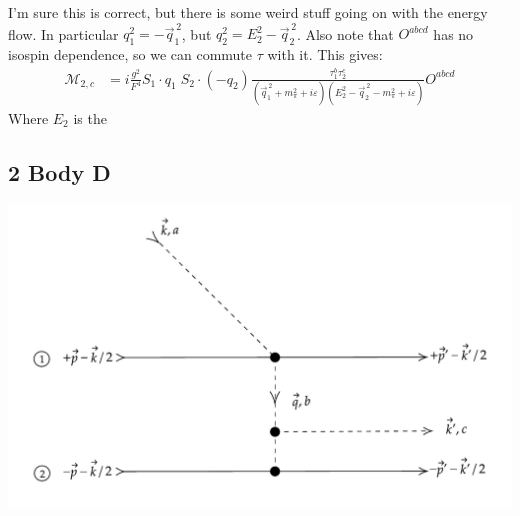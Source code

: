 \documentclass[11pt]{article}
\newcommand\mm{\mathcal{M}}
\newcommand{\sq}{^{\,2}}
\begin{document}
I'm sure this is correct, but there is some weird stuff going on with the energy flow.
In particular $q_1^2 =-\vec{q}_1\sq$, but $q_2^2=E_2^2 - \vec{q}_2\sq$.
Also note that $O^{abcd}$ has no isospin dependence, so we can commute $\tau$ with it. This gives:
\begin{align}
    \mm_{2,c}&=i \frac{g^2}{F^4} S_1 \cdot q_1\; S_2 \cdot(-q_2) 
    \frac{\tau_1^b \tau_2^c}{
        (\vec{q}_1\sq +m_\pi^2 + i \varepsilon)
        (E_2^2-\vec{q}_2\sq-m_\pi^2 + i \varepsilon)
    }
    O^{abcd}
\end{align}
Where $E_2$ is the 
\subsection{2 Body D}
\begin{center}
    \includegraphics[scale=0.6]{2d.pdf}
\end{center}
\end{document}

